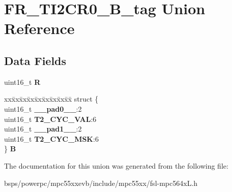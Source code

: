 \hypertarget{unionFR__TI2CR0__16B__tag}{}\section{F\+R\+\_\+\+T\+I2\+C\+R0\+\_\+B\+\_\+tag Union Reference}
\label{unionFR__TI2CR0__16B__tag}
\subsection*{Data Fields}
\begin{DoxyCompactItemize}
\item 
\mbox{\label{unionFR__TI2CR0__16B__tag_aab6aec930daecfa04e05e035409be7cb}} 
uint16\+\_\+t {\bfseries R}
\item 
\mbox{\label{unionFR__TI2CR0__16B__tag_acecd3f86931b1c69a96ddb2025b32bc1}} 
\begin{tabbing}
xx\=xx\=xx\=xx\=xx\=xx\=xx\=xx\=xx\=\kill
struct \{\\
\>uint16\_t {\bfseries \_\_pad0\_\_}:2\\
\>uint16\_t {\bfseries T2\_CYC\_VAL}:6\\
\>uint16\_t {\bfseries \_\_pad1\_\_}:2\\
\>uint16\_t {\bfseries T2\_CYC\_MSK}:6\\
\} {\bfseries B}\\

\end{tabbing}\end{DoxyCompactItemize}


The documentation for this union was generated from the following file\+:\begin{DoxyCompactItemize}
\item 
bsps/powerpc/mpc55xxevb/include/mpc55xx/fsl-\/mpc564x\+L.\+h\end{DoxyCompactItemize}
